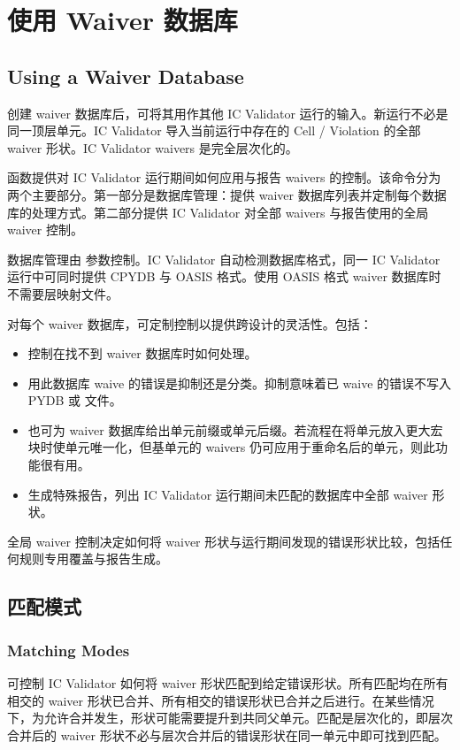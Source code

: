 \section{使用 Waiver 数据库}
\subsection*{Using a Waiver Database}

创建 waiver 数据库后，可将其用作其他 IC Validator 运行的输入。新运行不必是同一顶层单元。IC Validator 导入当前运行中存在的 Cell / Violation 的全部 waiver 形状。IC Validator waivers 是完全层次化的。

 函数提供对 IC Validator 运行期间如何应用与报告 waivers 的控制。该命令分为两个主要部分。第一部分是数据库管理：提供 waiver 数据库列表并定制每个数据库的处理方式。第二部分提供 IC Validator 对全部 waivers 与报告使用的全局 waiver 控制。

数据库管理由  参数控制。IC Validator 自动检测数据库格式，同一 IC Validator 运行中可同时提供 CPYDB 与 OASIS 格式。使用 OASIS 格式 waiver 数据库时不需要层映射文件。

对每个 waiver 数据库，可定制控制以提供跨设计的灵活性。包括：
\begin{itemize}
  \item 控制在找不到 waiver 数据库时如何处理。
  \item 用此数据库 waive 的错误是抑制还是分类。抑制意味着已 waive 的错误不写入 PYDB 或  文件。
  \item 也可为 waiver 数据库给出单元前缀或单元后缀。若流程在将单元放入更大宏块时使单元唯一化，但基单元的 waivers 仍可应用于重命名后的单元，则此功能很有用。
  \item 生成特殊报告，列出 IC Validator 运行期间未匹配的数据库中全部 waiver 形状。
\end{itemize}

全局 waiver 控制决定如何将 waiver 形状与运行期间发现的错误形状比较，包括任何规则专用覆盖与报告生成。

\subsection{匹配模式}
\subsubsection*{Matching Modes}

可控制 IC Validator 如何将 waiver 形状匹配到给定错误形状。所有匹配均在所有相交的 waiver 形状已合并、所有相交的错误形状已合并之后进行。在某些情况下，为允许合并发生，形状可能需要提升到共同父单元。匹配是层次化的，即层次合并后的 waiver 形状不必与层次合并后的错误形状在同一单元中即可找到匹配。

